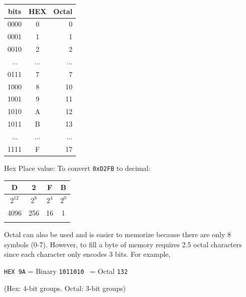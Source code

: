 \vspace{0.2in}	%
\begin{tabular}{|c|c|r|}
\hline
bits  &  HEX & Octal \\ \hline
0000  &  0   & 0     \\ \hline
0001  &  1   & 1     \\ \hline
0010  &  2   & 2     \\ \hline
...   &  ...    & ...      \\ \hline
0111  &  7   & 7     \\ \hline
1000  &  8   & 10     \\ \hline
1001  &  9   & 11     \\ \hline
1010  &  A   & 12     \\ \hline
1011  &  B   & 13     \\ \hline

...   & ...  & ...   \\ \hline
1111  &  F   & 17     \\
\hline
\end{tabular}

\vspace{0.2in}	%

Hex Place value: To convert {\tt 0xD2FB} to decimal:

\begin{tabular}{|c|c|c|c|}
\hline
D       &       2       &       F       &       B \\ \hline
$2^{12}$        &       $2^8$   &       $2^4$   &       $2^0$ \\ \hline
4096    &       256     &       16      &       1 \\ \hline
        &               &               &          \\ \hline
\end{tabular}

Octal
can also be used and is easier to memorize because there are
only 8 symbols (0-7). However, to fill
a byte of memory requires 2.5 octal characters since each
character only encodes 3 bits.  For example,

{\tt HEX 9A}  = Binary {\tt 1011010 } = Octal {\tt 132}

(Hex: 4-bit groups.   Octal: 3-bit groups)




